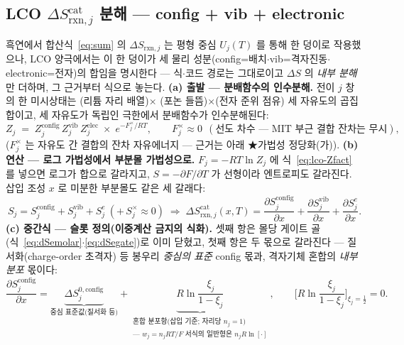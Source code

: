 \documentclass[11pt,a4paper]{article}
\newcommand{\rxn}{\mathrm{rxn}}
\begin{document}
\subsection{LCO $\Delta S_{\rxn,j}^\mathrm{cat}$ 분해 — config + vib + electronic}\label{sec:lco-decomp}
흑연에서 합산식~\eqref{eq:sum} 의 $\Delta S_{\rxn,j}$ 는 평형 중심 $U_j(T)$ 를 통해 한 덩이로 작용했으나, LCO 양극에서는 이 한 덩이가 세 물리 성분(config=배치$\cdot$vib=격자진동$\cdot$electronic=전자)의 합임을 명시한다 — 식$\cdot$코드 경로는 그대로이고 $\Delta S$ 의 \emph{내부 분해}만 더하며, 그 근거부터 식으로 놓는다. \textbf{(a) 출발 — 분배함수의 인수분해.} 전이 $j$ 창의 한 미시상태는 (리튬 자리 배열)$\times$
(포논 들뜸)$\times$(전자 준위 점유) 세 자유도의 곱집합이고, 세 자유도가 독립인 극한에서 분배함수가
인수분해된다:
\begin{equation}
Z_j\;=\;Z_j^\mathrm{config}\,Z_j^\mathrm{vib}\,Z_j^\mathrm{elec}\;\times\;e^{-F_j^{\times}/RT},
\qquad F_j^{\times}\approx0\ \ (\text{선도 차수 — MIT 부근 결합 잔차는 무시}),
\label{eq:lco-Zfact}
\end{equation}
($F_j^{\times}$ 는 자유도 간 결합의 잔차 자유에너지 — 근거는 아래 ★가법성 정당화(가)). \textbf{(b) 연산 — 로그
가법성에서 부분몰 가법성으로.} $F_j=-RT\ln Z_j$ 에 식~\eqref{eq:lco-Zfact} 를 넣으면 로그가 합으로
갈라지고, $S=-\partial F/\partial T$ 가 선형이라 엔트로피도 갈라진다. 삽입 조성 $x$ 로 미분한 부분몰도
같은 세 갈래다:
\begin{equation}
S_j=S_j^\mathrm{config}+S_j^\mathrm{vib}+S_j^{e}\ (+\,S_j^{\times}\!\approx\!0)
\;\Longrightarrow\;
\Delta S_{\rxn,j}^\mathrm{cat}(x,T)=\frac{\partial S_j^\mathrm{config}}{\partial x}
+\frac{\partial S_j^\mathrm{vib}}{\partial x}
+\frac{\partial S_j^{e}}{\partial x}.
\label{eq:lco-Sadd}
\end{equation}
\textbf{(c) 중간식 — 슬롯 정의(이중계산 금지의 식화).} 셋째 항은 몰당 게이트 골
(식~\eqref{eq:dSemolar}$\cdot$\eqref{eq:dSegate})로 이미 닫혔고, 첫째 항은 두 몫으로 갈라진다 —
질서화(charge-order 초격자) 등 봉우리 \emph{중심의 표준} config 몫과, 격자기체 혼합의 \emph{내부 분포}
몫이다:
\begin{equation}
\frac{\partial S_j^\mathrm{config}}{\partial x}
=\underbrace{\Delta S_j^{0,\mathrm{config}}}_{\text{중심 표준값(질서화 등)}}
+\underbrace{R\ln\frac{\xi_j}{1-\xi_j}}_{\substack{\text{혼합 분포항(삽입 기준; 자리당 }n_j{=}1\text{)}\\ \text{— }w_j{=}n_jRT/F\text{ 서식의 일반형은 }n_jR\ln[\cdot]}},
\qquad
\Big[R\ln\frac{\xi_j}{1-\xi_j}\Big]_{\xi_j=\frac12}=0.
\label{eq:lco-configsplit}
\end{equation}
\end{document}
